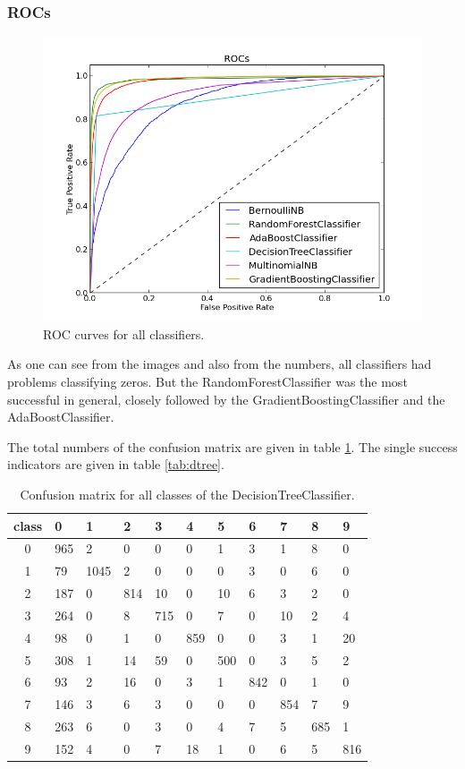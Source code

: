 \documentclass{scrartcl}
\begin{document}
\subsubsection{ROCs}
\begin{figure}[H]
\centering
  \includegraphics[width=.8\linewidth]{img/all_roc.png}
\caption{ROC curves for all classifiers.}
\label{fig:roc}
\end{figure}

As one can see from the images and also from the numbers, all classifiers had problems classifying zeros. But the RandomForestClassifier was the most successful in general, closely followed by the GradientBoostingClassifier and the AdaBoostClassifier.

The total numbers of the confusion matrix are given in table \ref{tab:confusion}. 
The single success indicators are given in table \ref{tab:dtree}.

\begin{table}[H]
\center
\begin{tabular}{c | llllllllll }
 class   &   0 &   1 &   2 &   3 &   4 &   5 &   6 &   7 &   8 & 9\\
 \hline
       0 & 965 &   2 &   0 &   0 &   0 &   1 &   3 &   1 &   8 &   0\\
       1 &  79 &1045 &   2 &   0 &   0 &   0 &   3 &   0 &   6 &   0\\
       2 & 187 &   0 & 814 &  10 &   0 &  10 &   6 &   3 &   2 &   0\\
       3 & 264 &   0 &   8 & 715 &   0 &   7 &   0 &  10 &   2 &   4\\
       4 &  98 &   0 &   1 &   0 & 859 &   0 &   0 &   3 &   1 &  20\\
       5 & 308 &   1 &  14 &  59 &   0 & 500 &   0 &   3 &   5 &   2\\
       6 &  93 &   2 &  16 &   0 &   3 &   1 & 842 &   0 &   1 &   0\\
       7 & 146 &   3 &   6 &   3 &   0 &   0 &   0 & 854 &   7 &   9\\
       8 & 263 &   6 &   0 &   3 &   0 &   4 &   7 &   5 & 685 &   1\\
       9 & 152 &   4 &   0 &   7 &  18 &   1 &   0 &   6 &   5 & 816\\
 
\end{tabular}
\caption{Confusion matrix for all classes of the DecisionTreeClassifier.}
\label{tab:confusion}
\end {table}
\end{document}
